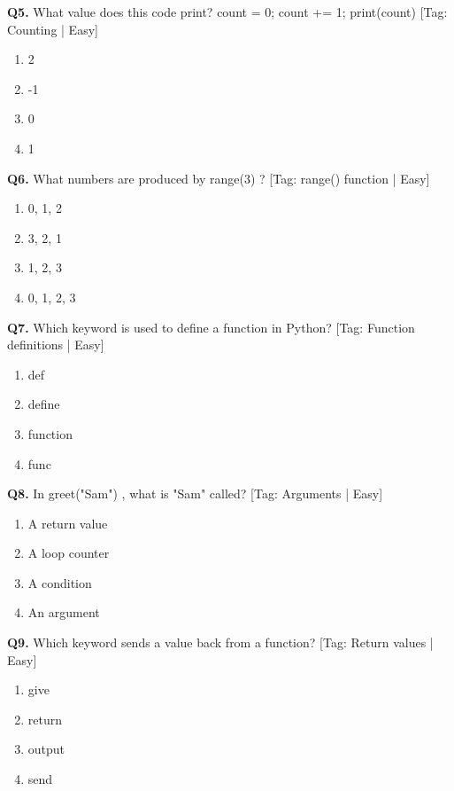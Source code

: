 \vspace{2mm}
\noindent\textbf{Q5.} What value does this code print? count = 0; count += 1; print(count) \hfill [Tag: Counting | Easy]
\begin{enumerate}[label=(\alph*),topsep=2pt,itemsep=1pt,partopsep=0pt,parsep=0pt]
    \item {2}
    \item {-1}
    \item {0}
    \item {1}
\end{enumerate}
\vspace{2mm}
\noindent\textbf{Q6.} What numbers are produced by range(3) ? \hfill [Tag: range() function | Easy]
\begin{enumerate}[label=(\alph*),topsep=2pt,itemsep=1pt,partopsep=0pt,parsep=0pt]
    \item {0, 1, 2}
    \item {3, 2, 1}
    \item {1, 2, 3}
    \item {0, 1, 2, 3}
\end{enumerate}
\vspace{2mm}
\noindent\textbf{Q7.} Which keyword is used to define a function in Python? \hfill [Tag: Function definitions | Easy]
\begin{enumerate}[label=(\alph*),topsep=2pt,itemsep=1pt,partopsep=0pt,parsep=0pt]
    \item {def}
    \item {define}
    \item {function}
    \item {func}
\end{enumerate}
\vspace{2mm}
\noindent\textbf{Q8.} In greet("Sam") , what is "Sam" called? \hfill [Tag: Arguments | Easy]
\begin{enumerate}[label=(\alph*),topsep=2pt,itemsep=1pt,partopsep=0pt,parsep=0pt]
    \item {A return value}
    \item {A loop counter}
    \item {A condition}
    \item {An argument}
\end{enumerate}
\vspace{2mm}
\noindent\textbf{Q9.} Which keyword sends a value back from a function? \hfill [Tag: Return values | Easy]
\begin{enumerate}[label=(\alph*),topsep=2pt,itemsep=1pt,partopsep=0pt,parsep=0pt]
    \item {give}
    \item {return}
    \item {output}
    \item {send}
\end{enumerate}
